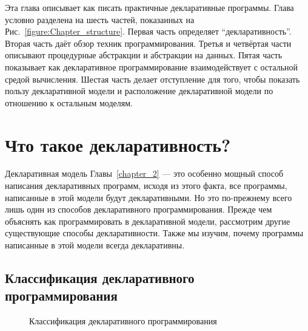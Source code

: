 Эта глава описывает как писать практичные декларативные программы. Глава условно разделена на шесть частей, показанных на Рис.~\ref{figure:Chapter_structure}. Первая часть определяет ``декларативность''. Вторая часть даёт обзор техник программирования. Третья и четвёртая части описывают процедурные абстракции и абстракции на данных. Пятая часть показывает как декларативное программирование взаимодействует с остальной средой вычисления. Шестая часть делает отступление для того, чтобы показать пользу декларативной модели и расположение декларативной модели по отношению к остальным моделям.


\section{Что такое декларативность?}

Декларативная модель Главы~\ref{chapter_2} --- это особенно мощный способ написания декларативных программ, исходя из этого факта, все программы, написанные в этой модели будут декларативными. Но это по-прежнему всего лишь один из способов декларативного программирования. Прежде чем объяснять как программировать в декларативной модели, рассмотрим другие существующие способы декларативности. Также мы изучим, почему программы написанные в этой модели всегда декларативны.

\subsection{Классификация декларативного программирования}

\begin{figure}
  \caption{Классификация декларативного программирования}
  \label{figure:Declarative_programming_classification}
\end{figure}

